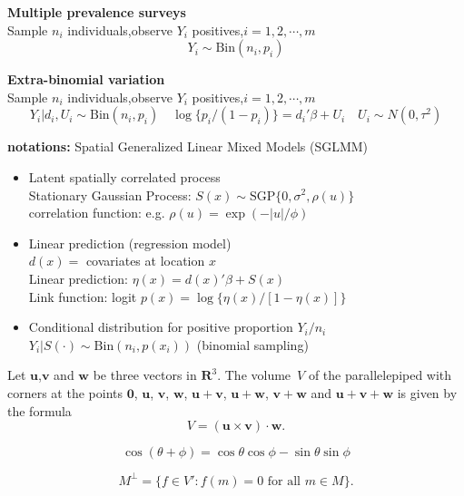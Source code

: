 \documentclass[10pt,aspectratio=43,compress,xcolor=x11names,UTF8]{beamer}
\begin{document}
\begin{frame}

{\color{red} \textbf{Multiple prevalence surveys}} \\
Sample $n_{i}$ individuals,observe $Y_{i}$ positives,$i=1,2,\cdots,m$
$$Y_{i}\sim \mathrm{Bin}(n_{i},p_{i})$$

{\color{red} \textbf{Extra-binomial variation}} \\
Sample $n_{i}$ individuals,observe $Y_{i}$ positives,$i=1,2,\cdots,m$
$$Y_{i}|d_{i},U_{i}\sim \mathrm{Bin}(n_{i},p_{i}) \quad 
\log\{p_{i}/(1-p_{i})\}=d_{i}'\beta+U_{i} \quad U_{i} \sim N(0,\tau^2)$$

\textbf{notations:} Spatial Generalized Linear Mixed Models (SGLMM)
\begin{itemize}
\item Latent spatially correlated process \\
Stationary Gaussian Process: $S(x) \sim \mathrm{SGP}\{0,\sigma^2,\rho(u)\} $ \\
correlation function: e.g. $\rho(u)=\exp(-|u|/\phi)$ 
\item Linear prediction (regression model)\\
$d(x)=$ covariates at location $x$\\
Linear prediction: $\eta(x)=d(x)'\beta + S(x)$ \\
Link function: logit $p(x)=\log\{\eta(x)/[1-\eta(x)]\}$ 
\item Conditional distribution for positive proportion $Y_{i}/n_{i}$\\
$Y_{i}|S(\cdot) \sim \mathrm{Bin}(n_{i},p(x_{i}))$ (binomial sampling)
\end{itemize}

\end{frame}

\begin{frame}
Let $\mathbf{u}$,$\mathbf{v}$ and $\mathbf{w}$ be three
vectors in ${\mathbf R}^3$. The volume~$V$ of the
parallelepiped with corners at the points
$\mathbf{0}$, $\mathbf{u}$, $\mathbf{v}$,
$\mathbf{w}$, $\mathbf{u}+\mathbf{v}$,
$\mathbf{u}+\mathbf{w}$, $\mathbf{v}+\mathbf{w}$
and $\mathbf{u}+\mathbf{v}+\mathbf{w}$
is given by the formula
\[ V = (\mathbf{u} \times \mathbf{v}) \cdot \mathbf{w}.\] 

\[ \cos(\theta + \phi) = \cos \theta \cos \phi
      - \sin \theta \sin \phi \]

\[ M^\bot = \{ f \in V' : f(m) = 0 \mbox{ for all } m \in M \}.\] 	  
\end{frame}
\end{document}
